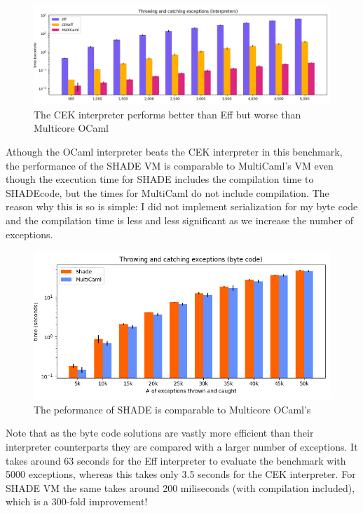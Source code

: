 \documentclass[class=article, crop=false]{standalone}
\begin{document}
\begin{figure}
    \centering
    \includegraphics[width=40em]{eval_plots/interp_exception.png}
    \caption{The CEK interpreter performs better than Eff but worse than Multicore OCaml}
    \label{fig:exception-interpreters}
\end{figure}

Athough the OCaml interpreter beats the CEK interpreter in this benchmark, the performance of the SHADE VM
is comparable to MultiCaml's VM even though the execution time for SHADE includes the compilation time to SHADEcode,
but the times for MultiCaml do not include compilation. The reason why this is so is simple: I did not implement
serialization for my byte code and the compilation time is less and less significant as we increase the number of exceptions.

\begin{figure}
    \centering
    \includegraphics[width=35em]{eval_plots/comp_exception.png}
    \caption{The peformance of SHADE is comparable to Multicore OCaml's}
    \label{fig:exception-bytecode}
\end{figure}

Note that as the byte code solutions are vastly more efficient than their interpreter counterparts they are compared with a larger number of exceptions.
It takes around 63 seconds for the Eff interpreter to evaluate the benchmark with 5000 exceptions, whereas this takes only
3.5 seconds for the CEK interpreter. For SHADE VM the same takes around 200 miliseconds (with compilation included),
which is a 300-fold improvement!
\end{document}
